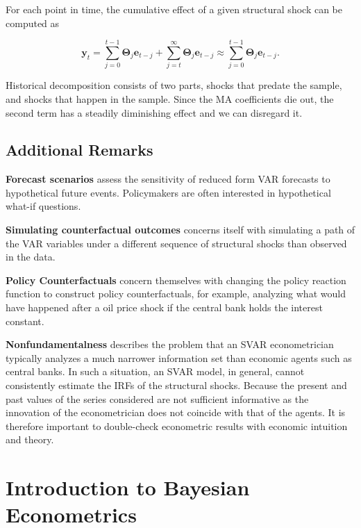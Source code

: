 For each point in time, the cumulative effect of a given structural shock can be computed as

\begin{equation}
	\bm{y}_t = \sum^{t-1}_{j=0}\bm{\Theta}_j\bm{e}_{t-j} + \sum^{\infty}_{j=t}\bm{\Theta}_j\bm{e}_{t-j} \approx \sum^{t-1}_{j=0}\bm{\Theta}_j\bm{e}_{t-j}.
\end{equation}

Historical decomposition consists of two parts, shocks that predate the sample, and shocks that happen in the sample. Since the MA coefficients die out, the second term has a steadily diminishing effect and we can disregard it.

\subsection{Additional Remarks}

\textbf{Forecast scenarios} assess the sensitivity of reduced form VAR forecasts to hypothetical future events. Policymakers are often interested in hypothetical what-if questions.

\textbf{Simulating counterfactual outcomes} concerns itself with simulating a path of the VAR variables under a different sequence of structural shocks than observed in the data.

\textbf{Policy Counterfactuals} concern themselves with changing the policy reaction function to construct policy counterfactuals, for example, analyzing what would have happened after a oil price shock if the central bank holds the interest constant.

\textbf{Nonfundamentalness} describes the problem that an SVAR econometrician typically analyzes a much narrower information set than economic agents such as central banks. In such a situation, an SVAR model, in general, cannot consistently estimate the IRFs of the structural shocks. Because the present and past values of the series considered are not sufficient informative as the innovation of the econometrician does not coincide with that of the agents. It is therefore important to double-check econometric results with economic intuition and theory.



\section{Introduction to Bayesian Econometrics}

